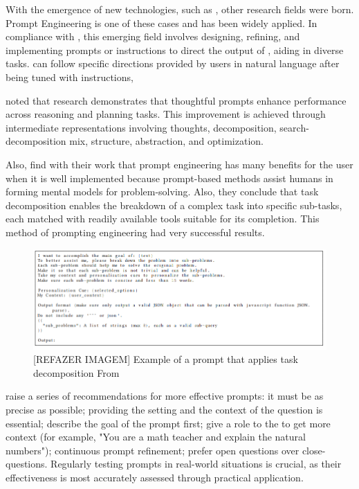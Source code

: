 With the emergence of new technologies, such as {\llm}, other research fields were born. Prompt Engineering is one of these cases and has been widely applied. In compliance with \citet{mesko_prompt_2023}, this emerging field involves designing, refining, and implementing prompts or instructions to direct the output of {\llm}, aiding in diverse tasks. {\llm} can follow specific directions provided by users in natural language after being tuned with instructions,

\citet{ma_beyond_2023} noted that research demonstrates that thoughtful prompts enhance {\llm} performance across reasoning and planning tasks. This improvement is achieved through intermediate representations involving thoughts, decomposition, search-decomposition mix, structure, abstraction, and optimization.

Also, \citet{ma_beyond_2023} find with their work that prompt engineering has many benefits for the user when it is well implemented because prompt-based methods assist humans in forming mental models for problem-solving. Also, they conclude that task decomposition enables the breakdown of a complex task into specific sub-tasks, each matched with readily available tools suitable for its completion. This method of prompting engineering had very successful results.

\begin{figure}[ht]
    \includegraphics[width=14cm]{figs/chapter2/prompt.png}
    \centering
    \caption{[REFAZER IMAGEM] Example of a prompt that applies task decomposition From \citet{ma_beyond_2023}}
\end{figure}


\citet{mesko_prompt_2023} raise a series of recommendations for more effective {\llm} prompts: it must be as precise as possible; providing the setting and the context of the question is essential; describe the goal of the prompt first; give a role to the {\llm} to get more context (for example, "You are a math teacher and explain the natural numbers"); continuous {\llm} prompt refinement; prefer open questions over close-questions. Regularly testing prompts in real-world situations is crucial, as their effectiveness is most accurately assessed through practical application.


